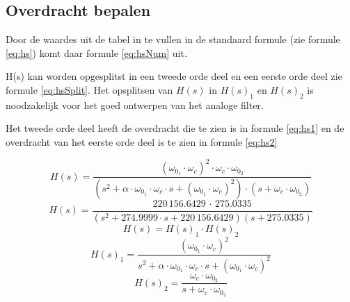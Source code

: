 \subsection{Overdracht bepalen}
\begin{minipage}{0.40\textwidth}
	Door de waardes uit de tabel in te vullen in de standaard formule (zie formule \ref{eq:hs})
	komt daar formule \ref{eq:hsNum} uit.

	\noindent
	H(s) kan worden opgesplitst in een tweede orde deel en een eerste orde deel zie formule \ref{eq:hsSplit}.
	Het opsplitsen van $H(s)$ in $H(s)_1$ en $H(s)_2$ is noodzakelijk voor het goed ontwerpen van het analoge 
	filter.

	\noindent
	Het tweede orde deel heeft de overdracht die te zien is in formule \ref{eq:hs1} en de overdracht van
	het eerste orde	deel is te zien in formule \ref{eq:hs2}
\end{minipage}
\hfill
\begin{minipage}{0.60\textwidth}
	\begin{equation} \label{eq:hs}
		H(s)=\frac{(\omega_{0_1}\cdot\omega_c)^2\cdot\omega_c\cdot\omega_{0_2}}{(s^2+ \alpha \cdot \omega_{0_1} \cdot \omega_c \cdot s + (\omega_{0_1}\cdot\omega_c)^2)\cdot (s + \omega_c \cdot \omega_{0_2})}
	\end{equation}
	\begin{equation} \label{eq:hsNum}
		H(s)=\frac{220\, 156.6429\,\cdot\, 275.0335}{(s^2+274.9999\cdot s+220\, 156.6429)(s+275.0335)}
	\end{equation}
	\begin{equation} \label{eq:hsSplit}
		H(s)= H(s)_1 \cdot H(s)_2
	\end{equation}
	\begin{equation} \label{eq:hs1}
		H(s)_1=\frac{(\omega_{0_1}\cdot\omega_c)^2}{s^2+ \alpha \cdot \omega_{0_1} \cdot \omega_c \cdot s + (\omega_{0_1}\cdot\omega_c)^2}
	\end{equation}
	\begin{equation} \label{eq:hs2}
		H(s)_2=\frac{\omega_c\cdot\omega_{0_2}}{s + \omega_c \cdot \omega_{0_2}}
	\end{equation}
\end{minipage}
 

